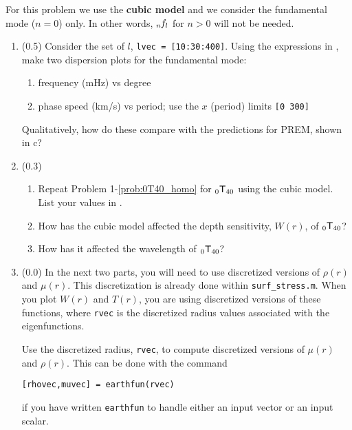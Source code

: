 \documentclass[11pt,titlepage,fleqn]{article}
\newcommand{\tnl}[2]{\mbox{$_{#1}\ssT_{#2}$}}
\newcommand{\fnl}{\mbox{${}_{n\hspace{-0.2 mm}}f_l$}}        %
\begin{document}
For this problem we use the {\bf cubic model} and we consider the fundamental mode ($n=0$) only. In other words, $\fnl$ for $n > 0$ will not be needed.

\begin{enumerate}
\item (0.5) Consider the set of $l$, \verb+lvec = [10:30:400]+. Using the expressions in , make two dispersion plots for the fundamental mode:
%
\begin{enumerate}
\item frequency (mHz) vs degree
\item phase speed (km/s) vs period; use the $x$ (period) limits \verb+[0 300]+
\end{enumerate}
%
Qualitatively, how do these compare with the predictions for PREM, shown in c?

\item (0.3)
%
\begin{enumerate}
\item Repeat Problem 1-\ref{prob:0T40_homo} for \tnl{0}{40} using the cubic model. List your values in .
\item How has the cubic model affected the depth sensitivity, $W(r)$, of \tnl{0}{40}?
\item How has it affected the wavelength of \tnl{0}{40}?
\end{enumerate}

\label{prob:0T40_cubic}


\item (0.0) In the next two parts, you will need to use discretized versions of $\rho(r)$ and $\mu(r)$. This discretization is already done within \verb+surf_stress.m+. When you plot $W(r)$ and $T(r)$, you are using discretized versions of these functions, where \verb+rvec+ is the discretized radius values associated with the eigenfunctions.

Use the discretized radius, \verb+rvec+, to compute discretized versions of $\mu(r)$ and $\rho(r)$. This can be done with the command
%
\begin{verbatim}
[rhovec,muvec] = earthfun(rvec)
\end{verbatim}
%
if you have written \verb+earthfun+ to handle either an input vector or an input scalar.



\end{enumerate}
\end{document}
